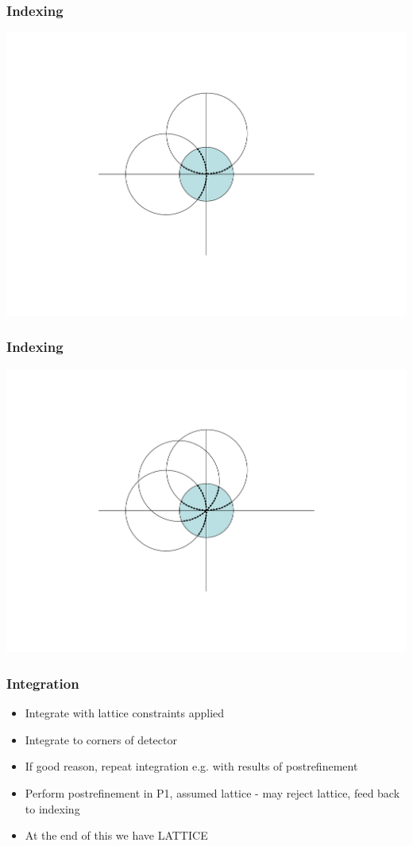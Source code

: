 \documentclass[slides,compress]{beamer}
\begin{document}
\begin{frame}
\frametitle{Indexing}
\hspace{6cm}
\includegraphics[scale=0.5]{figures/Ewald2Image.pdf}
\end{frame}

\begin{frame}
\frametitle{Indexing}
\hspace{6cm}
\includegraphics[scale=0.5]{figures/Ewald3Image.pdf}
\end{frame}

\begin{frame}
\frametitle{Integration}
\begin{itemize}
\item{Integrate with lattice constraints applied}
\item{Integrate to corners of detector}
\item{If good reason, repeat integration e.g. with results of postrefinement}
\item{Perform postrefinement in P1, assumed lattice - may reject lattice,
feed back to indexing}
\item{At the end of this we have LATTICE}
\end{itemize}
\end{frame}
\end{document}

